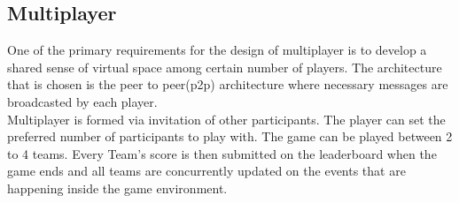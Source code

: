 \subsection*{Multiplayer}
One of the primary requirements for the design of multiplayer is to develop a shared sense of virtual space among certain number of players. The architecture that is chosen is the peer to peer(p2p) architecture where necessary messages are broadcasted by each player.\\
Multiplayer is formed via invitation of other participants. The player can set the preferred number of participants to play with. The game can be played between 2 to 4 teams. Every Team's score is then submitted on the leaderboard when the game ends and all teams are concurrently updated on the events that are happening inside the game environment.
